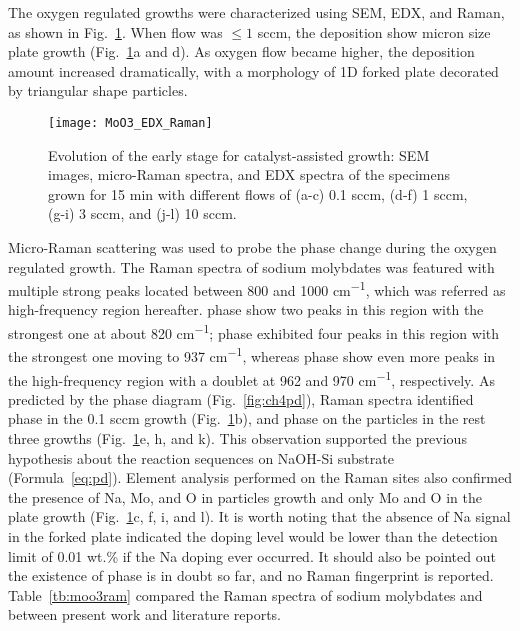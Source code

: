 The oxygen regulated growths were characterized using SEM, EDX, and Raman, as shown in Fig.~\ref{fig:ch4oxy}. When  flow was $\leq 1$ sccm, the deposition show micron size plate growth (Fig.~\ref{fig:ch4oxy}a and d). As oxygen flow became higher, the deposition amount increased dramatically, with a morphology of 1D forked plate decorated by triangular shape particles.
\begin{figure}[htb]
\centering
\texttt{[image: MoO3\_EDX\_Raman]}
\caption[Evolution of the early stage for catalyst-assisted  growth]{Evolution of the early stage for catalyst-assisted  growth: SEM images, micro-Raman spectra, and EDX spectra of the specimens grown for 15 min with different  flows of (a-c) 0.1 sccm, (d-f) 1 sccm, (g-i) 3 sccm, and (j-l) 10 sccm. }
\label{fig:ch4oxy}
\end{figure}
Micro-Raman scattering was used to probe the phase change during the oxygen regulated growth. The Raman spectra of sodium molybdates was featured with multiple strong peaks located between 800 and 1000 \si{cm^{-1}}, which was referred as high-frequency region hereafter.  phase show two peaks in this region with the strongest one at about 820 \si{cm^{-1}};  phase exhibited four peaks in this region with the strongest one moving to 937 \si{cm^{-1}}, whereas  phase show even more peaks in the high-frequency region with a doublet at 962 and 970 \si{cm^{-1}}, respectively.\cite{Schofield2005,Saraiva2011} As predicted by the phase diagram (Fig.~\ref{fig:ch4pd}), Raman spectra identified  phase in the 0.1 sccm growth (Fig.~\ref{fig:ch4oxy}b), and  phase on the particles in the rest three growths (Fig.~\ref{fig:ch4oxy}e, h, and k). This observation supported the previous hypothesis about the reaction sequences on NaOH-Si substrate (Formula~\ref{eq:pd}). Element analysis performed on the Raman sites also confirmed the presence of Na, Mo, and O in particles growth and only Mo and O in the plate growth (Fig.~\ref{fig:ch4oxy}c, f, i, and l). It is worth noting that the absence of Na signal in the forked  plate indicated the doping level would be lower than the detection limit of 0.01 wt.\% if the Na doping ever occurred. It should also be pointed out the existence of  phase is in doubt so far, and no Raman fingerprint is reported.\cite{Fomichev1992} Table~\ref{tb:moo3ram} compared the Raman spectra of sodium molybdates and  between present work and literature reports.
